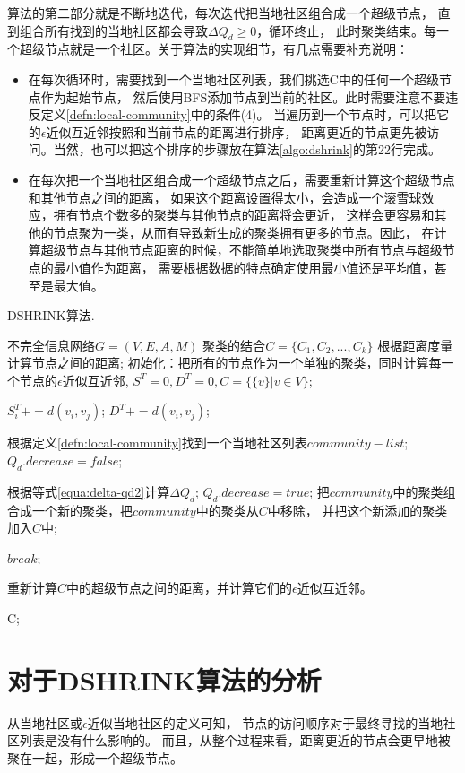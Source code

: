 算法的第二部分就是不断地迭代，每次迭代把当地社区组合成一个超级节点，
直到组合所有找到的当地社区都会导致$\Delta Q_d \geq 0$，循环终止，
此时聚类结束。每一个超级节点就是一个社区。关于算法的实现细节，有几点需要补充说明：

\begin{itemize}
    \item 在每次循环时，需要找到一个当地社区列表，我们挑选C中的任何一个超级节点作为起始节点，
    然后使用BFS添加节点到当前的社区。此时需要注意不要违反定义\ref{defn:local-community}中的条件(4)。
    当遍历到一个节点时，可以把它的$\epsilon$近似互近邻按照和当前节点的距离进行排序，
    距离更近的节点更先被访问。当然，也可以把这个排序的步骤放在算法\ref{algo:dshrink}的第22行完成。

    \item 在每次把一个当地社区组合成一个超级节点之后，需要重新计算这个超级节点和其他节点之间的距离，
    如果这个距离设置得太小，会造成一个滚雪球效应，拥有节点个数多的聚类与其他节点的距离将会更近，
    这样会更容易和其他的节点聚为一类，从而有导致新生成的聚类拥有更多的节点。因此，
    在计算超级节点与其他节点距离的时候，不能简单地选取聚类中所有节点与超级节点的最小值作为距离，
    需要根据数据的特点确定使用最小值还是平均值，甚至是最大值。
\end{itemize}


\begin{algorithm}[htb]
    \caption{ DSHRINK算法.}
    \label{algo:dshrink}
    \begin{algorithmic}[1]
        \Require
        不完全信息网络$G = (V, E, A, M)$
        \Ensure
        聚类的结合$C = \{C_1, C_2, ..., C_k\}$
        \State 根据距离度量计算节点之间的距离;
        \State 初始化：把所有的节点作为一个单独的聚类，同时计算每一个节点的$\epsilon$近似互近邻,
        $S^T = 0, D^T = 0, C = \{\{v\} | v \in V \}$;

                \State $S_i^T += d(v_i, v_j)$;
                \State $D^T += d(v_i, v_j)$;
            \EndFor
        \EndFor

            \State 根据定义\ref{defn:local-community}找到一个当地社区列表$community-list$;
            \State $Q_d.decrease = false$;

                \State 根据等式\ref{equa:delta-qd2}计算$\Delta Q_d$;
                    \State $Q_d.decrease = true$;
                    \State 把$community$中的聚类组合成一个新的聚类，把$community$中的聚类从$C$中移除，
                    并把这个新添加的聚类加入$C$中;
                \EndIf
            \EndFor

                \State $break$;
            \EndIf

            \State 重新计算$C$中的超级节点之间的距离，并计算它们的$\epsilon$近似互近邻。
        \EndWhile

        \Return C;

    \end{algorithmic}
\end{algorithm}

\section{对于DSHRINK算法的分析}

从当地社区或$\epsilon$近似当地社区的定义可知，
节点的访问顺序对于最终寻找的当地社区列表是没有什么影响的。
而且，从整个过程来看，距离更近的节点会更早地被聚在一起，形成一个超级节点。
